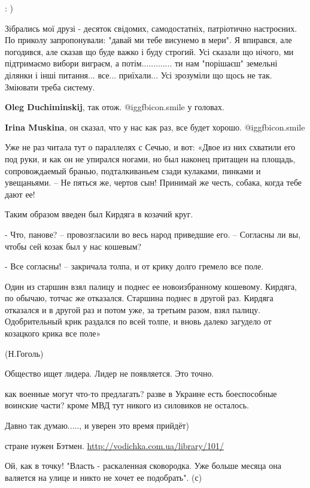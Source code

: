 \begin{itemize}
: )


Зібрались мої друзі - десяток свідомих, самодостатніх, патріотично настроєних.
По приколу запропонували: "давай ми тебе висунемо в мери". Я впирався, але
погодився, але сказав що буде важко і буду строгий. Усі сказали що нічого, ми
підтримаємо вибори виграєм, а потім............. ти нам "порішаєш" земельні
ділянки і інші питання... все... приїхали... Усі зрозуміли що щось не так.
Зміювати треба систему.

\textbf{Oleg Duchiminskij}, так отож. @igg{fbicon.smile}  у головах.

\textbf{Irina Muskina}, он сказал, что у нас как раз, все будет хорошо. @igg{fbicon.smile} 


Уже не раз читала тут о параллелях с Сечью, и вот: «Двое из них схватили его
под руки, и как он не упирался ногами, но был наконец притащен на площадь,
сопровождаемый бранью, подталкиваньем сзади кулаками, пинками и увещаньями. –
Не пяться же, чертов сын! Принимай же честь, собака, когда тебе дают ее!

Таким образом введен был Кирдяга в козачий круг.

- Что, панове? – провозгласили во весь народ приведшие его. – Согласны ли вы,
чтобы сей козак был у нас кошевым?

- Все согласны! – закричала толпа, и от крику долго гремело все поле.

Один из старшин взял палицу и поднес ее новоизбранному кошевому. Кирдяга, по
обычаю, тотчас же отказался. Старшина поднес в другой раз. Кирдяга отказался и
в другой раз и потом уже, за третьим разом, взял палицу. Одобрительный крик
раздался по всей толпе, и вновь далеко загудело от козацкого крика все поле»

(Н.Гоголь)

Общество ищет лидера. Лидер не появляется. Это точно.

как военные могут что-то предлагать? разве в Украине есть боеспособные воинские части? кроме МВД тут никого из силовиков не осталось.

Давно так думаю....., и уверен это время прийдёт)

стране нужен Бэтмен. \url{http://vodichka.com.ua/library/101/}

Ой, как в точку! "Власть - раскаленная сковородка. Уже больше месяца она валяется на улице и никто не хочет ее подобрать". (с)


\end{itemize}
